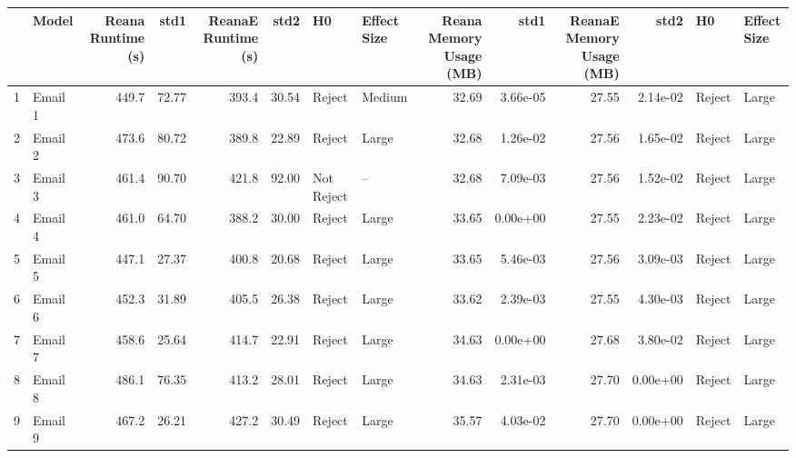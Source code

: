 \begin{tabular}{llrrrrllrrrrll}
\toprule
{} &     Model &  Reana Runtime (s) &    std1 &  ReanaE Runtime (s) &   std2 &          H0 & Effect Size &  Reana Memory Usage (MB) &      std1 &  ReanaE Memory Usage (MB) &      std2 &      H0 & Effect Size \\
\midrule
1  &   Email 1 &              449.7 &   72.77 &               393.4 &  30.54 &      Reject &      Medium &                    32.69 &  3.66e-05 &                     27.55 &  2.14e-02 &  Reject &       Large \\
2  &   Email 2 &              473.6 &   80.72 &               389.8 &  22.89 &      Reject &       Large &                    32.68 &  1.26e-02 &                     27.56 &  1.65e-02 &  Reject &       Large \\
3  &   Email 3 &              461.4 &   90.70 &               421.8 &  92.00 &  Not Reject &          -- &                    32.68 &  7.09e-03 &                     27.56 &  1.52e-02 &  Reject &       Large \\
4  &   Email 4 &              461.0 &   64.70 &               388.2 &  30.00 &      Reject &       Large &                    33.65 &  0.00e+00 &                     27.55 &  2.23e-02 &  Reject &       Large \\
5  &   Email 5 &              447.1 &   27.37 &               400.8 &  20.68 &      Reject &       Large &                    33.65 &  5.46e-03 &                     27.56 &  3.09e-03 &  Reject &       Large \\
6  &   Email 6 &              452.3 &   31.89 &               405.5 &  26.38 &      Reject &       Large &                    33.62 &  2.39e-03 &                     27.55 &  4.30e-03 &  Reject &       Large \\
7  &   Email 7 &              458.6 &   25.64 &               414.7 &  22.91 &      Reject &       Large &                    34.63 &  0.00e+00 &                     27.68 &  3.80e-02 &  Reject &       Large \\
8  &   Email 8 &              486.1 &   76.35 &               413.2 &  28.01 &      Reject &       Large &                    34.63 &  2.31e-03 &                     27.70 &  0.00e+00 &  Reject &       Large \\
9  &   Email 9 &              467.2 &   26.21 &               427.2 &  30.49 &      Reject &       Large &                    35.57 &  4.03e-02 &                     27.70 &  0.00e+00 &  Reject &       Large \\

\end{tabular}
